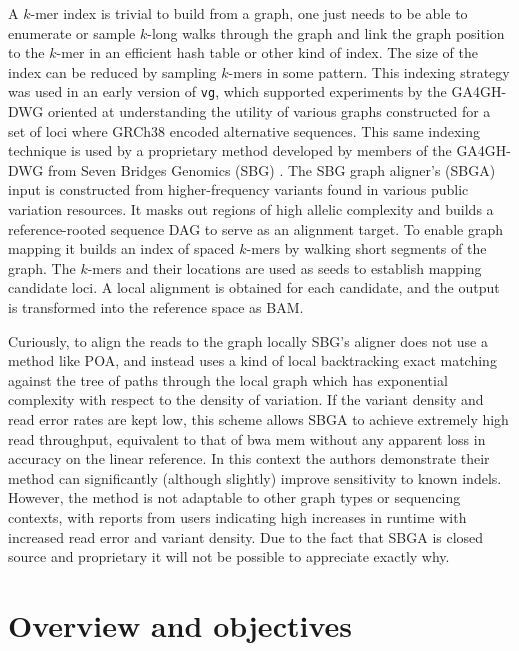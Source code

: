 A $k$-mer index is trivial to build from a graph, one just needs to be able to enumerate or sample $k$-long walks through the graph and link the graph position to the $k$-mer in an efficient hash table or other kind of index.
The size of the index can be reduced by sampling $k$-mers in some pattern.
This indexing strategy was used in an early version of {\tt vg}, which supported experiments by the GA4GH-DWG \cite{novak2017genome} oriented at understanding the utility of various graphs constructed for a set of loci where GRCh38 encoded alternative sequences.
This same indexing technique is used by a proprietary method developed by members of the GA4GH-DWG from Seven Bridges Genomics (SBG) \cite{rakocevic2018fast}.
The SBG graph aligner's (SBGA) input is constructed from higher-frequency variants found in various public variation resources.
It masks out regions of high allelic complexity and builds a reference-rooted sequence DAG to serve as an alignment target.
To enable graph mapping it builds an index of spaced $k$-mers by walking short segments of the graph.
The $k$-mers and their locations are used as seeds to establish mapping candidate loci.
A local alignment is obtained for each candidate, and the output is transformed into the reference space as BAM.

Curiously, to align the reads to the graph locally SBG's aligner does not use a method like POA, and instead uses a kind of local backtracking exact matching against the tree of paths through the local graph which has exponential complexity with respect to the density of variation.
If the variant density and read error rates are kept low, this scheme allows SBGA to achieve extremely high read throughput, equivalent to that of bwa mem without any apparent loss in accuracy on the linear reference.
In this context the authors demonstrate their method can significantly (although slightly) improve sensitivity to known indels.
However, the method is not adaptable to other graph types or sequencing contexts, with reports from users indicating high increases in runtime with increased read error and variant density.
Due to the fact that SBGA is closed source and proprietary it will not be possible to appreciate exactly why.

\section{Overview and objectives}

